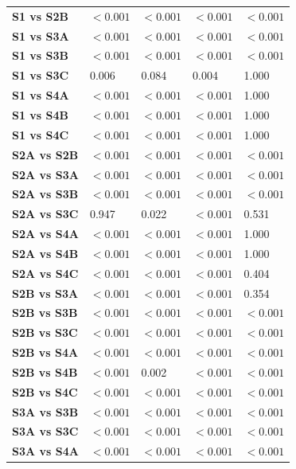\begin{table}[H]
{\begin{tabular}{lllll}
        \textbf{S1 vs S2B} & $< 0.001$ & $< 0.001$ & $< 0.001$ & $< 0.001$ \\
        \textbf{S1 vs S3A} & $< 0.001$ & $< 0.001$ & $< 0.001$ & $< 0.001$ \\
        \textbf{S1 vs S3B} & $< 0.001$ & $< 0.001$ & $< 0.001$ & $< 0.001$ \\
        \textbf{S1 vs S3C} & 0.006 & 0.084 & 0.004 & 1.000 \\
        \textbf{S1 vs S4A} & $< 0.001$ & $< 0.001$ & $< 0.001$ & 1.000 \\
        \textbf{S1 vs S4B} & $< 0.001$ & $< 0.001$ & $< 0.001$ & 1.000 \\
        \textbf{S1 vs S4C} & $< 0.001$ & $< 0.001$ & $< 0.001$ & 1.000 \\
        \textbf{S2A vs S2B} & $< 0.001$ & $< 0.001$ & $< 0.001$ & $< 0.001$ \\
        \textbf{S2A vs S3A} & $< 0.001$ & $< 0.001$ & $< 0.001$ & $< 0.001$ \\
        \textbf{S2A vs S3B} & $< 0.001$ & $< 0.001$ & $< 0.001$ & $< 0.001$ \\
        \textbf{S2A vs S3C} & 0.947 & 0.022 & $< 0.001$ & 0.531 \\
        \textbf{S2A vs S4A} & $< 0.001$ & $< 0.001$ & $< 0.001$ & 1.000 \\
        \textbf{S2A vs S4B} & $< 0.001$ & $< 0.001$ & $< 0.001$ & 1.000 \\
        \textbf{S2A vs S4C} & $< 0.001$ & $< 0.001$ & $< 0.001$ & 0.404 \\
        \textbf{S2B vs S3A} & $< 0.001$ & $< 0.001$ & $< 0.001$ & 0.354 \\
        \textbf{S2B vs S3B} & $< 0.001$ & $< 0.001$ & $< 0.001$ & $< 0.001$ \\
        \textbf{S2B vs S3C} & $< 0.001$ & $< 0.001$ & $< 0.001$ & $< 0.001$ \\
        \textbf{S2B vs S4A} & $< 0.001$ & $< 0.001$ & $< 0.001$ & $< 0.001$ \\
        \textbf{S2B vs S4B} & $< 0.001$ & 0.002 & $< 0.001$ & $< 0.001$ \\
        \textbf{S2B vs S4C} & $< 0.001$ & $< 0.001$ & $< 0.001$ & $< 0.001$ \\
        \textbf{S3A vs S3B} & $< 0.001$ & $< 0.001$ & $< 0.001$ & $< 0.001$ \\
        \textbf{S3A vs S3C} & $< 0.001$ & $< 0.001$ & $< 0.001$ & $< 0.001$ \\
        \textbf{S3A vs S4A} & $< 0.001$ & $< 0.001$ & $< 0.001$ & $< 0.001$ \\

\end{tabular}}
\end{table}
